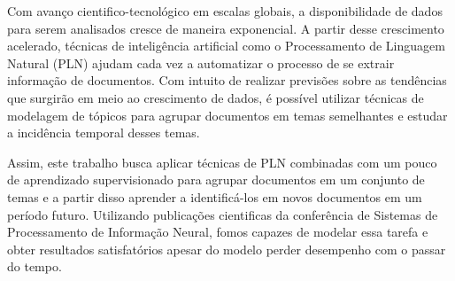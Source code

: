 Com avanço cientifico-tecnológico em escalas globais, a disponibilidade de dados para serem analisados cresce de maneira exponencial. A partir desse crescimento acelerado, técnicas de inteligência artificial como o Processamento de Linguagem Natural (PLN) ajudam cada vez a automatizar o processo de se extrair informação de documentos. Com intuito de realizar previsões sobre as tendências que surgirão em meio ao crescimento de dados, é possível utilizar técnicas de modelagem de tópicos para agrupar documentos em temas semelhantes e estudar a incidência temporal desses temas. 

Assim, este trabalho busca aplicar técnicas de PLN combinadas com um pouco de aprendizado supervisionado para agrupar documentos em um conjunto de temas e a partir disso aprender a identificá-los em novos documentos em um período futuro. Utilizando publicações cientificas da conferência de Sistemas de Processamento de Informação Neural, fomos capazes de modelar essa tarefa e obter resultados satisfatórios apesar do modelo perder desempenho com o passar do tempo.